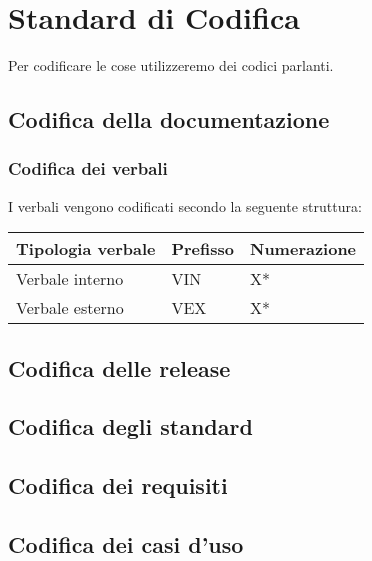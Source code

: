 \chapter{Standard di Codifica}
Per codificare le cose utilizzeremo dei codici parlanti.

\section{Codifica della documentazione}

\subsection{Codifica dei verbali}
I verbali vengono codificati secondo la seguente struttura:

\begin{center}
    \begin{tabularx}{\linewidth}{l | l | X}            
        \textbf{Tipologia verbale} & \textbf{Prefisso} & \textbf{Numerazione}\\
        \hline
        Verbale interno & VIN & X* \\
        Verbale esterno & VEX & X* \\
    \end{tabularx}
\end{center}

\section{Codifica delle release}

\section{Codifica degli standard}

\section{Codifica dei requisiti}

\section{Codifica dei casi d'uso}